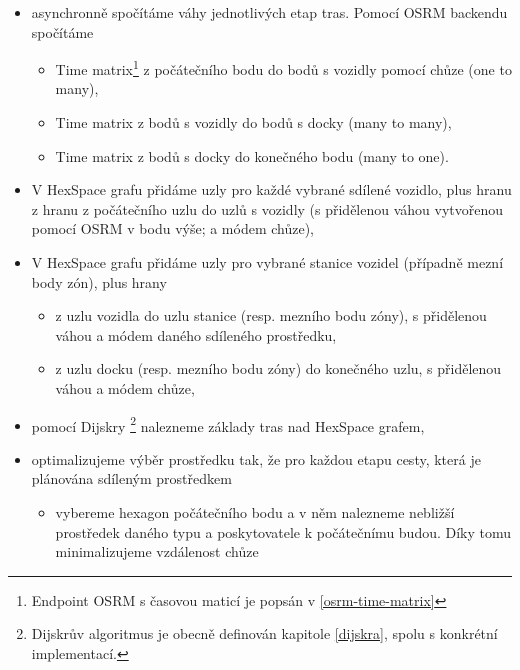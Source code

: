 \documentclass[thesis=M,czech]{FITthesis}[2019/12/23]
\theoremstyle{plain}
\theoremstyle{definition}
\begin{document}
\begin{enumerate}
\begin{itemize}
		\item asynchronně spočítáme váhy jednotlivých etap tras. Pomocí OSRM backendu spočítáme 
		\begin{itemize}
			\item Time matrix\footnote{Endpoint OSRM s časovou maticí je popsán v \ref{osrm-time-matrix}} z počátečního bodu do bodů s vozidly pomocí chůze (one to many),
			\item Time matrix z bodů s vozidly do bodů s docky (many to many),
			\item Time matrix z bodů s docky do konečného bodu (many to one).
		\end{itemize}
		
		\item V HexSpace grafu přidáme uzly pro každé vybrané sdílené vozidlo, plus hranu z hranu z počátečního uzlu do uzlů s vozidly (s přidělenou váhou vytvořenou pomocí OSRM v bodu výše; a módem chůze),
		\item V HexSpace grafu přidáme uzly pro vybrané stanice vozidel (případně mezní body zón), plus hrany 
		\begin{itemize}
			\item z uzlu vozidla do uzlu stanice (resp. mezního bodu zóny), s přidělenou váhou a módem daného sdíleného prostředku,
			\item z uzlu docku (resp. mezního bodu zóny) do konečného uzlu, s přidělenou váhou a módem chůze,
		\end{itemize}

		\item pomocí Dijskry \footnote{Dijskrův algoritmus je obecně definován kapitole \ref{dijskra}, spolu s konkrétní implementací.} nalezneme základy tras nad HexSpace grafem,

		\item optimalizujeme výběr prostředku tak, že pro každou etapu cesty, která je plánována sdíleným prostředkem
		\begin{itemize}
			\item vybereme hexagon počátečního bodu a v něm nalezneme nebližší prostředek daného typu a poskytovatele k počátečnímu budou. Díky tomu minimalizujeme vzdálenost chůze
		\end{itemize}


\end{itemize}
\end{enumerate}
\end{document}
